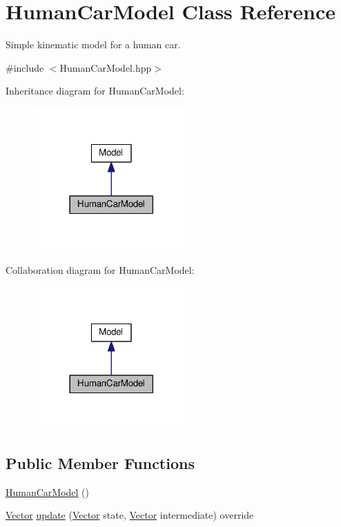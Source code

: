 \hypertarget{classHumanCarModel}{}\section{Human\+Car\+Model Class Reference}
\label{classHumanCarModel}


Simple kinematic model for a human car.  




{\ttfamily \#include $<$Human\+Car\+Model.\+hpp$>$}



Inheritance diagram for Human\+Car\+Model\+:\nopagebreak
\begin{figure}[H]
\begin{center}
\leavevmode
\includegraphics[width=170pt]{classHumanCarModel__inherit__graph}
\end{center}
\end{figure}


Collaboration diagram for Human\+Car\+Model\+:\nopagebreak
\begin{figure}[H]
\begin{center}
\leavevmode
\includegraphics[width=170pt]{classHumanCarModel__coll__graph}
\end{center}
\end{figure}
\subsection*{Public Member Functions}
\begin{DoxyCompactItemize}
\item 
\hyperlink{classHumanCarModel_a50fe8a46cefbbdc0feaedae39947da50}{Human\+Car\+Model} ()
\item 
\hyperlink{Agent_8hpp_a5dd127bb3cb18b011cf5fd80a906e830}{Vector} \hyperlink{classHumanCarModel_aeaa782fab7b9ea5d9b245df0ced2b7cb}{update} (\hyperlink{Agent_8hpp_a5dd127bb3cb18b011cf5fd80a906e830}{Vector} state, \hyperlink{Agent_8hpp_a5dd127bb3cb18b011cf5fd80a906e830}{Vector} intermediate) override
\end{DoxyCompactItemize}

